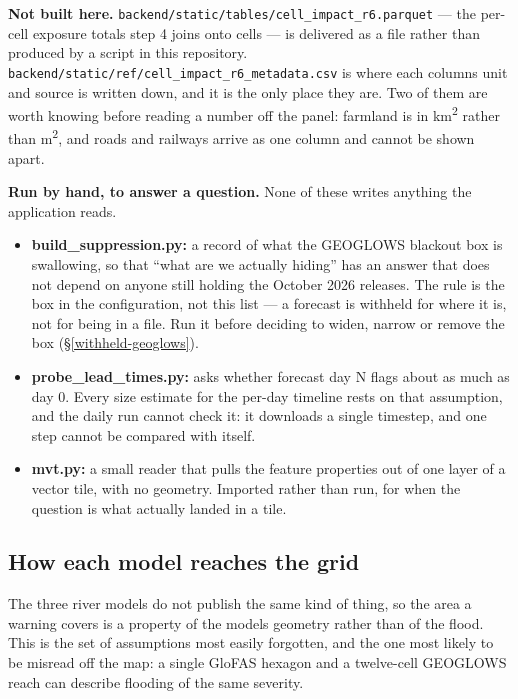\textbf{Not built here.}
\texttt{backend/static/tables/cell\_impact\_r6.parquet} --- the per-cell exposure totals step 4 joins onto cells --- is delivered as a file rather than produced by a script in this repository.
\texttt{backend/static/ref/cell\_impact\_r6\_metadata.csv} is where each column\textquotesingle s unit and source is written down, and it is the only place they are.
Two of them are worth knowing before reading a number off the panel: farmland is in km\textsuperscript{2} rather than m\textsuperscript{2}, and roads and railways arrive as one column and cannot be shown apart.

\textbf{Run by hand, to answer a question.}
None of these writes anything the application reads.

\begin{itemize}
\item
  \textbf{build\_suppression.py:} a record of what the GEOGLOWS blackout box is swallowing, so that ``what are we actually hiding'' has an answer that does not depend on anyone still holding the October 2026 releases. The rule is the box in the configuration, not this list --- a forecast is withheld for where it is, not for being in a file. Run it before deciding to widen, narrow or remove the box (\S\ref{withheld-geoglows}).
\item
  \textbf{probe\_lead\_times.py:} asks whether forecast day N flags about as much as day 0. Every size estimate for the per-day timeline rests on that assumption, and the daily run cannot check it: it downloads a single timestep, and one step cannot be compared with itself.
\item
  \textbf{mvt.py:} a small reader that pulls the feature properties out of one layer of a vector tile, with no geometry. Imported rather than run, for when the question is what actually landed in a tile.
\end{itemize}

\subsection{How each model reaches the grid}\label{how-each-model-reaches-the-grid}

The three river models do not publish the same kind of thing, so the area a warning covers is a property of the model\textquotesingle s geometry rather than of the flood.
This is the set of assumptions most easily forgotten, and the one most likely to be misread off the map: a single GloFAS hexagon and a twelve-cell GEOGLOWS reach can describe flooding of the same severity.

